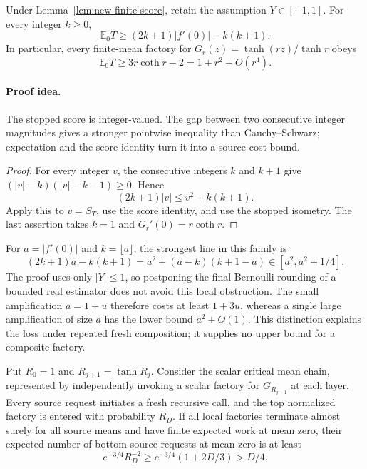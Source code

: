 \begin{corollary}
\label{cor:new-integer-score}
Under Lemma~\ref{lem:new-finite-score}, retain the assumption $Y\in[-1,1]$.
For every integer $k\ge0$,
\[
 \mathbb E_0T\ge(2k+1)|f'(0)|-k(k+1).
\]
In particular, every finite-mean factory for
$G_r(z)=\tanh(rz)/\tanh r$ obeys
\[
 \mathbb E_0T\ge3r\coth r-2
              =1+r^2+O(r^4).
\]
\end{corollary}
\paragraph{Proof idea.}
The stopped score is integer-valued. The gap between two consecutive integer
magnitudes gives a stronger pointwise inequality than Cauchy--Schwarz;
expectation and the score identity turn it into a source-cost bound.

\begin{proof}
For every integer $v$, the consecutive integers $k$ and $k+1$ give
$(|v|-k)(|v|-k-1)\ge0$.  Hence
\[
 (2k+1)|v|\le v^2+k(k+1).
\]
Apply this to $v=S_T$, use the score identity, and use the stopped
isometry.  The last assertion takes $k=1$ and
$G_r'(0)=r\coth r$.
\end{proof}

For $a=|f'(0)|$ and $k=\lfloor a\rfloor$, the strongest line in
this family is
\[
 (2k+1)a-k(k+1)
 =a^2+(a-k)(k+1-a)\in[a^2,a^2+1/4].
\]
The proof uses only $|Y|\le1$, so postponing the final Bernoulli
rounding of a bounded real estimator does not avoid this local obstruction.
The small amplification $a=1+u$ therefore costs at least $1+3u$,
whereas a single large amplification of size $a$ has the lower bound
$a^2+O(1)$. This distinction explains the loss under repeated fresh
composition; it supplies no upper bound for a composite factory.

\begin{proposition}
\label{prop:new-local-obstruction}
Put $R_0=1$ and $R_{j+1}=\tanh R_j$.  Consider the scalar critical
mean chain, represented by independently invoking a scalar factory
for $G_{R_{j-1}}$ at each layer.  Every source request initiates a
fresh recursive call, and the top normalized factory is entered
with probability $R_D$.  If all local factories terminate almost
surely for all source means and have finite expected work at mean
zero, their expected number of bottom source requests at mean zero
is at least
\[
 e^{-3/4}R_D^{-2}
 \ge e^{-3/4}(1+2D/3)>D/4.
\]
\end{proposition}
